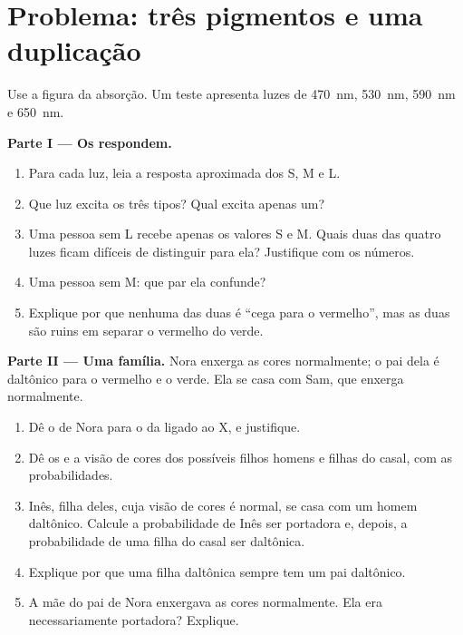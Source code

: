 \section{Problema: três pigmentos e uma duplicação}

\begin{problem}
\label{pb:g11:the-eye:1}
Use a figura da absorção. Um teste apresenta luzes de \qty{470}{nm},
\qty{530}{nm}, \qty{590}{nm} e \qty{650}{nm}.

\medskip
\noindent\textbf{Parte I --- Os  respondem.}
\begin{enumerate}
  \item Para cada luz, leia a resposta aproximada dos  S, M e L.
  \item Que luz excita os três tipos? Qual excita apenas um?
  \item Uma pessoa sem  L recebe apenas os valores S e M. Quais
        duas das quatro luzes ficam difíceis de distinguir para ela?
        Justifique com os números.
  \item Uma pessoa sem  M: que par ela confunde?
  \item Explique por que nenhuma das duas é ``cega para o vermelho'',
        mas as duas são ruins em separar o vermelho do verde.
\end{enumerate}

\medskip
\noindent\textbf{Parte II --- Uma família.}
Nora enxerga as cores normalmente; o pai dela é daltônico para o
vermelho e o verde. Ela se casa com Sam, que enxerga normalmente.
\begin{enumerate}[resume]
  \item Dê o  de Nora para o  da  ligado ao X, e
        justifique.
  \item Dê os  e a visão de cores dos possíveis filhos homens
        e filhas do casal, com as probabilidades.
  \item Inês, filha deles, cuja visão de cores é normal, se casa com um
        homem daltônico. Calcule a probabilidade de Inês ser portadora
        e, depois, a probabilidade de uma filha do casal ser daltônica.
  \item Explique por que uma filha daltônica sempre tem um pai
        daltônico.
  \item A mãe do pai de Nora enxergava as cores normalmente. Ela era
        necessariamente portadora? Explique.
\end{enumerate}


\end{problem}
